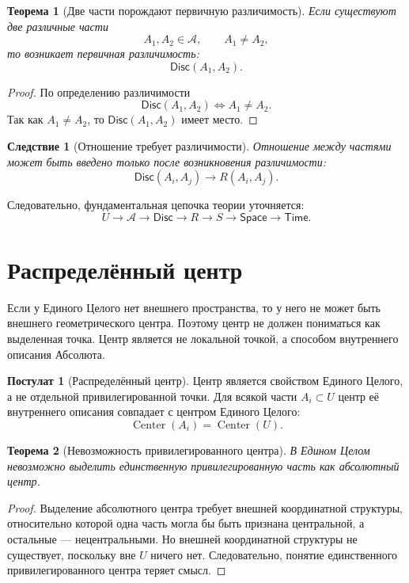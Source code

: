 \documentclass[12pt,a4paper,oneside]{book}
\theoremstyle{definition}
\newtheorem{postulate}{Постулат}[chapter]
\theoremstyle{plain}
\newtheorem{theorem}{Теорема}[chapter]
\newtheorem{corollary}{Следствие}[chapter]
\theoremstyle{remark}
\newcommand{\Whole}{U}
\newcommand{\Parts}{\mathcal A}
\newcommand{\Rel}{R}
\newcommand{\State}{S}
\newcommand{\Space}{\mathsf{Space}}
\newcommand{\Time}{\mathsf{Time}}
\newcommand{\Center}{\operatorname{Center}}
\newcommand{\Disc}{\mathsf{Disc}}
\begin{document}
\begin{theorem}[Две части порождают первичную различимость]
Если существуют две различные части
\[
A_1,A_2\in\Parts,\qquad A_1\neq A_2,
\]
то возникает первичная различимость:
\[
\Disc(A_1,A_2).
\]
\end{theorem}

\begin{proof}
По определению различимости
\[
\Disc(A_1,A_2)\iff A_1\neq A_2.
\]
Так как \(A_1\neq A_2\), то \(\Disc(A_1,A_2)\) имеет место.
\end{proof}

\begin{corollary}[Отношение требует различимости]
Отношение между частями может быть введено только после возникновения различимости:
\[
\Disc(A_i,A_j)\longrightarrow \Rel(A_i,A_j).
\]
\end{corollary}

Следовательно, фундаментальная цепочка теории уточняется:
\[
\Whole
\longrightarrow
\Parts
\longrightarrow
\Disc
\longrightarrow
\Rel
\longrightarrow
\State
\longrightarrow
\Space
\longrightarrow
\Time.
\]

\section{Распределённый центр}

Если у Единого Целого нет внешнего пространства, то у него не может быть внешнего геометрического центра. Поэтому центр не должен пониматься как выделенная точка. Центр является не локальной точкой, а способом внутреннего описания Абсолюта.

\begin{postulate}[Распределённый центр]
Центр является свойством Единого Целого, а не отдельной привилегированной точки. Для всякой части \(A_i\subset\Whole\) центр её внутреннего описания совпадает с центром Единого Целого:
\[
\Center(A_i)=\Center(\Whole).
\]
\end{postulate}

\begin{theorem}[Невозможность привилегированного центра]
В Едином Целом невозможно выделить единственную привилегированную часть как абсолютный центр.
\end{theorem}

\begin{proof}
Выделение абсолютного центра требует внешней координатной структуры, относительно которой одна часть могла бы быть признана центральной, а остальные --- нецентральными. Но внешней координатной структуры не существует, поскольку вне \(\Whole\) ничего нет. Следовательно, понятие единственного привилегированного центра теряет смысл.
\end{proof}
\end{document}
